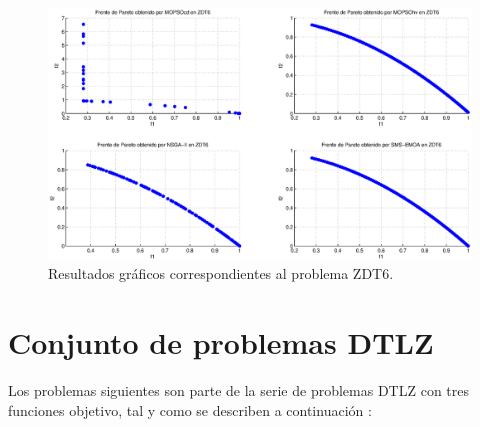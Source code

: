   \begin{figure}
      \begin{center}
	  \includegraphics[scale=0.45]{Cap4/rzdt6r.eps}
      \end{center}
	\caption{Resultados gr\'aficos correspondientes al problema ZDT6.}
      \label{fig:rZDT6}
      \end{figure}
\clearpage
   
  
\section{Conjunto de problemas DTLZ} 

Los problemas siguientes son parte de la serie de problemas DTLZ con tres funciones objetivo, tal y como se describen a continuaci\'on 
\cite{dtlz2002a}:

